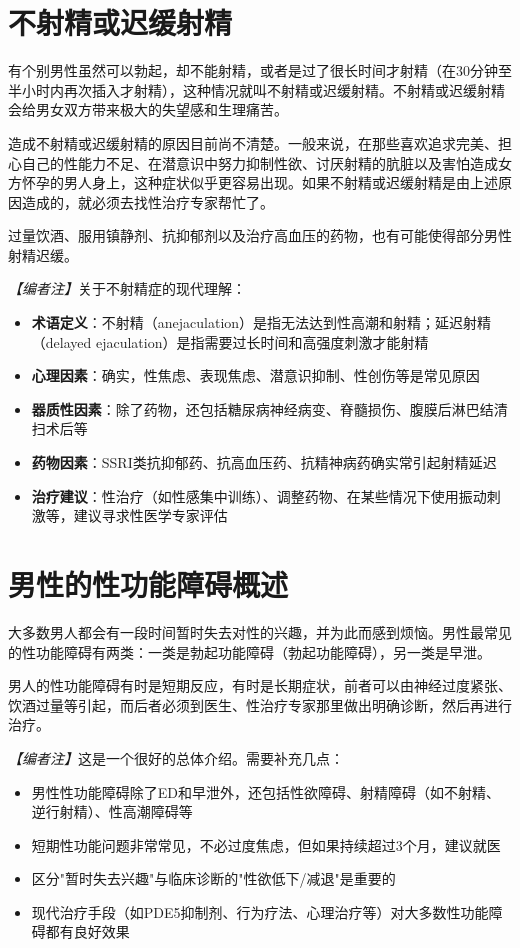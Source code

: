 \section{不射精或迟缓射精}

有个别男性虽然可以勃起，却不能射精，或者是过了很长时间才射精（在30分钟至半小时内再次插入才射精），这种情况就叫不射精或迟缓射精。不射精或迟缓射精会给男女双方带来极大的失望感和生理痛苦。

造成不射精或迟缓射精的原因目前尚不清楚。一般来说，在那些喜欢追求完美、担心自己的性能力不足、在潜意识中努力抑制性欲、讨厌射精的肮脏以及害怕造成女方怀孕的男人身上，这种症状似乎更容易出现。如果不射精或迟缓射精是由上述原因造成的，就必须去找性治疗专家帮忙了。

过量饮酒、服用镇静剂、抗抑郁剂以及治疗高血压的药物，也有可能使得部分男性射精迟缓。

\noindent\textit{【编者注】}关于不射精症的现代理解：
\begin{itemize}
	\item \textbf{术语定义}：不射精（anejaculation）是指无法达到性高潮和射精；延迟射精（delayed ejaculation）是指需要过长时间和高强度刺激才能射精
	\item \textbf{心理因素}：确实，性焦虑、表现焦虑、潜意识抑制、性创伤等是常见原因
	\item \textbf{器质性因素}：除了药物，还包括糖尿病神经病变、脊髓损伤、腹膜后淋巴结清扫术后等
	\item \textbf{药物因素}：SSRI类抗抑郁药、抗高血压药、抗精神病药确实常引起射精延迟
	\item \textbf{治疗建议}：性治疗（如性感集中训练）、调整药物、在某些情况下使用振动刺激等，建议寻求性医学专家评估
\end{itemize}

\section{男性的性功能障碍概述}

大多数男人都会有一段时间暂时失去对性的兴趣，并为此而感到烦恼。男性最常见的性功能障碍有两类：一类是勃起功能障碍（勃起功能障碍），另一类是早泄。

男人的性功能障碍有时是短期反应，有时是长期症状，前者可以由神经过度紧张、饮酒过量等引起，而后者必须到医生、性治疗专家那里做出明确诊断，然后再进行治疗。

\noindent\textit{【编者注】}这是一个很好的总体介绍。需要补充几点：
\begin{itemize}
	\item 男性性功能障碍除了ED和早泄外，还包括性欲障碍、射精障碍（如不射精、逆行射精）、性高潮障碍等
	\item 短期性功能问题非常常见，不必过度焦虑，但如果持续超过3个月，建议就医
	\item 区分"暂时失去兴趣"与临床诊断的"性欲低下/减退"是重要的
	\item 现代治疗手段（如PDE5抑制剂、行为疗法、心理治疗等）对大多数性功能障碍都有良好效果
\end{itemize}

